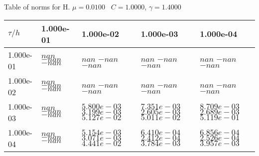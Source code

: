\begin{center}
Table of norms for H. $\mu = 0.0100$ \, $C = 1.0000$, $\gamma = 1.4000$
  
\begin{tabular}{|p{1in}|p{1in}|p{1in}|p{1in}|p{1in}|} \hline
$\tau / h$ &1.000e-01 &1.000e-02 &1.000e-03 &1.000e-04 \\ \hline 
1.000e-01 & $nan$  $-nan$  $-nan$  & $nan$  $-nan$  $-nan$  & $nan$  $-nan$  $-nan$  & $nan$  $-nan$  $-nan$  \\ \hline 
1.000e-02 & $nan$  $-nan$  $-nan$  & $nan$  $-nan$  $-nan$  & $nan$  $-nan$  $-nan$  & $nan$  $-nan$  $-nan$  \\ \hline 
1.000e-03 & $nan$  $-nan$  $-nan$  & $5.800e-03$  $3.199e-03$  $5.127e-02$  & $7.351e-03$  $2.605e-03$  $5.011e-02$  & $8.709e-03$  $2.689e-03$  $5.119e-01$  \\ \hline 
1.000e-04 & $nan$  $-nan$  $-nan$  & $5.154e-03$  $3.071e-03$  $4.441e-02$  & $6.410e-04$  $2.412e-04$  $3.784e-03$  & $6.856e-04$  $2.526e-04$  $3.957e-03$  \\ \hline 

\end{tabular}\\[20pt]
\end{center}

